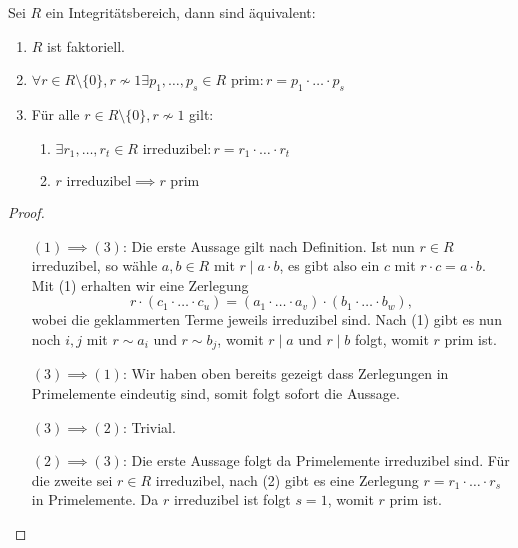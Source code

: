 \begin{proposition}
    Sei $R$ ein Integritätsbereich, dann sind äquivalent:
    \begin{enumerate}
        \item $R$ ist faktoriell.
        \item $ \forall r \in R \setminus \{0\}, r \not\sim 1 \exists p_1, \hdots, p_s \in R \text{ prim}: r = p_1 \cdot \hdots \cdot p_s $
        \item Für alle $ r \in R \setminus \{0\}, r \not\sim 1 $ gilt:
        \begin{enumerate}[label=\roman*.]
            \item $ \exists r_1, \hdots, r_t \in R \text{ irreduzibel}: r = r_1 \cdot \hdots \cdot r_t $
            \item $ r \text{ irreduzibel} \implies r \text{ prim} $
        \end{enumerate}
    \end{enumerate}
\end{proposition}


\begin{proof}{\ }
    \begin{itemize}[leftmargin=2.5cm]
        \item[$(1) \implies (3)$:] Die erste Aussage gilt nach Definition. Ist nun $r \in R$ irreduzibel, so wähle $a, b \in R$ mit $r \mid a \cdot b$, es gibt also ein $c$ mit $r \cdot c = a \cdot b$. Mit (1) erhalten wir eine Zerlegung
        $$ r \cdot (c_1 \cdot \hdots \cdot c_u) = (a_1 \cdot \hdots \cdot a_v) \cdot (b_1 \cdot \hdots \cdot b_w), $$
        wobei die geklammerten Terme jeweils irreduzibel sind. Nach (1) gibt es nun noch $i, j$ mit $r \sim a_i$ und $r \sim b_j$, womit $r \mid a$ und $r \mid b$ folgt, womit $r$ prim ist.

        \item[$(3) \implies (1)$:] Wir haben oben bereits gezeigt dass Zerlegungen in Primelemente eindeutig sind, somit folgt sofort die Aussage.
        
        \item[$(3) \implies (2)$:] Trivial.

        \item[$(2) \implies (3)$:] Die erste Aussage folgt da Primelemente irreduzibel sind. Für die zweite sei $r \in R$ irreduzibel, nach (2) gibt es eine Zerlegung $r = r_1 \cdot \hdots \cdot r_s$ in Primelemente. Da $r$ irreduzibel ist folgt $s = 1$, womit $r$ prim ist.
    \end{itemize}
\end{proof}

